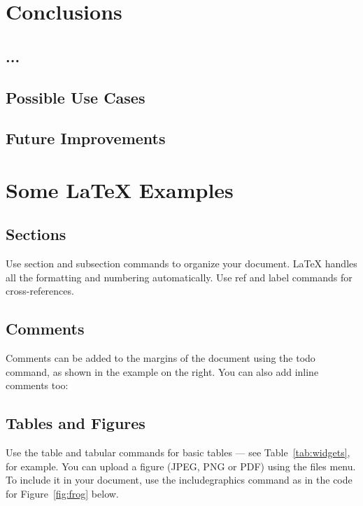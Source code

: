 \section{Conclusions}
\subsection{...}
\subsection{Possible Use Cases}
\subsection{Future Improvements}


\section{Some \LaTeX{} Examples}
\label{sec:examples}

\subsection{Sections}

Use section and subsection commands to organize your document. \LaTeX{} handles all the formatting and numbering automatically. Use ref and label commands for cross-references.

\subsection{Comments}

Comments can be added to the margins of the document using the  todo command, as shown in the example on the right. You can also add inline comments too:


\subsection{Tables and Figures}

Use the table and tabular commands for basic tables --- see Table~\ref{tab:widgets}, for example. You can upload a figure (JPEG, PNG or PDF) using the files menu. To include it in your document, use the includegraphics command as in the code for Figure~\ref{fig:frog} below.

